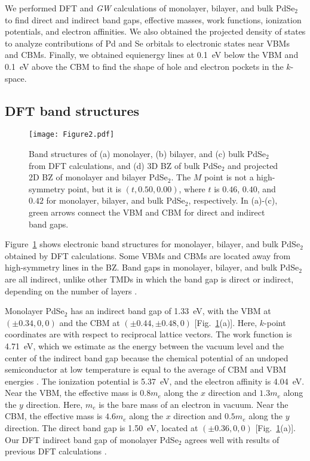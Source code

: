 \documentclass[aps,prb,longbibliography,twocolumn]{revtex4-2}
\begin{document}
We performed DFT and {\em GW} calculations of monolayer, bilayer, 
and bulk PdSe$_2$ to find direct and indirect band gaps, effective masses, work functions,
ionization potentials, and electron affinities. 
We also obtained the projected density of states to analyze 
contributions of Pd and Se orbitals to electronic states near VBMs and CBMs. 
Finally, we obtained equienergy lines at 0.1~eV 
below the VBM and 0.1~eV above the CBM to find the shape of hole and electron
pockets in the $k$-space.

\subsection{DFT band structures}

\begin{figure}
\texttt{[image: Figure2.pdf]}
\caption{\label{fig2pdse2} Band structures of (a) monolayer, (b) bilayer, and
(c) bulk PdSe$_2$ from DFT calculations, and (d) 3D BZ of bulk PdSe$_2$ and
projected 2D BZ of monolayer and bilayer PdSe$_2$.
The $M$ point is not a high-symmetry point, but it is $(t, 0.50, 0.00)$, where $t$ is $0.46$, $0.40$, and $0.42$ for monolayer, bilayer, and bulk PdSe$_2$, respectively.
In (a)-(c), green arrows connect the VBM and CBM for direct and indirect band gaps.}
\end{figure}






Figure~\ref{fig2pdse2} shows electronic band structures for monolayer, bilayer, and 
bulk PdSe$_2$ obtained by DFT calculations.  
Some VBMs and CBMs are located away from high-symmetry lines in the BZ.
Band gaps in monolayer, bilayer, and bulk PdSe$_2$ are all indirect, 
unlike other TMDs in which the band gap is direct or indirect,
depending on the number of layers \cite{Mak2010, Zhang2014}. 


Monolayer PdSe$_2$ has an indirect band gap of 1.33~eV, with
the VBM at $(\pm0.34,0,0)$ and the CBM at $(\pm0.44,\pm0.48,0)$ [Fig.~\ref{fig2pdse2}(a)].
Here, $k$-point coordinates are with respect to reciprocal lattice vectors.
The work function is 4.71~eV, which we estimate as the energy 
between the vacuum level and the center of the indirect band 
gap because the chemical potential of an undoped 
semiconductor at low temperature is equal to the average of CBM 
and VBM energies \cite{Kim2021}. 
The ionization potential is 5.37~eV, and the electron affinity is 4.04~eV.
Near the VBM, the effective mass is $0.8m_e$ along the $x$ direction
and $1.3m_e$ along the $y$ direction. Here, $m_e$ is the bare mass
of an electron in vacuum.
Near the CBM, the effective mass is $4.6m_e$ along the $x$ direction
and $0.5m_e$ along the $y$ direction.
The direct band gap is 1.50~eV, located at $(\pm0.36,0,0)$ [Fig.~\ref{fig2pdse2}(a)].
Our DFT indirect band gap 
of monolayer PdSe$_2$ agrees well with results of
previous DFT calculations \cite{Lebegue2013, Sun2015}. 
\end{document}
